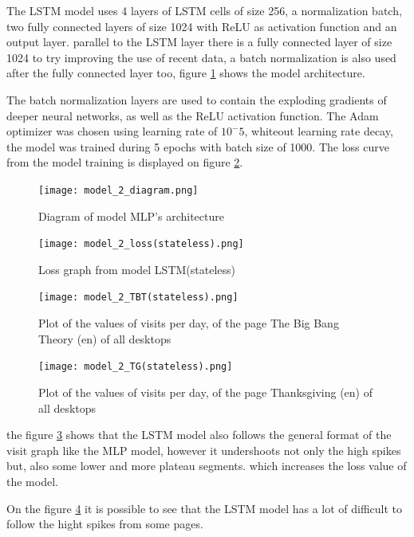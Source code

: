 The LSTM model uses 4 layers of LSTM cells of size 256, a normalization batch,
two fully connected layers of size 1024 with ReLU as activation function and an output layer.
parallel to the LSTM layer there is a fully connected layer of size 1024 to try improving the use of recent data,
a batch normalization is also used after the fully connected layer too, figure \ref{fig:model_2_diagram} shows the model architecture.

The batch normalization layers are used to contain the exploding gradients of deeper neural networks,
as well as the ReLU activation function. The Adam optimizer was chosen using learning rate of $10^-5$,
whiteout learning rate decay, the model was trained during 5 epochs with batch size of 1000.
The loss curve from the model training is displayed on figure \ref{fig:model_2_loss}.

\begin{figure}
	\centering
	\texttt{[image: model\_2\_diagram.png]}
	\caption{Diagram of model MLP's architecture\label{fig:model_2_diagram}}
\end{figure}

\begin{figure}
	\centering
	\texttt{[image: model\_2\_loss(stateless).png]}
	\caption{Loss graph from model LSTM(stateless)\label{fig:model_2_loss}}
\end{figure}

\begin{figure}
	\centering
	\texttt{[image: model\_2\_TBT(stateless).png]}
	\caption{Plot of the values of visits per day, of the page The Big Bang Theory (en) of all desktops\label{fig:model_2_TBT}}
\end{figure}

\begin{figure}
	\centering
	\texttt{[image: model\_2\_TG(stateless).png]}
	\caption{Plot of the values of visits per day, of the page Thanksgiving (en) of all desktops\label{fig:model_2_TG}}
\end{figure}

the figure \ref{fig:model_2_TBT} shows that the LSTM model also follows the general format of the visit graph like the MLP model, however it undershoots not only the high spikes but, also some lower and more plateau segments.
which increases the loss value of the model.

On the figure \ref{fig:model_2_TG} it is possible to see that the LSTM model has a lot of difficult to follow the hight spikes from some pages.

